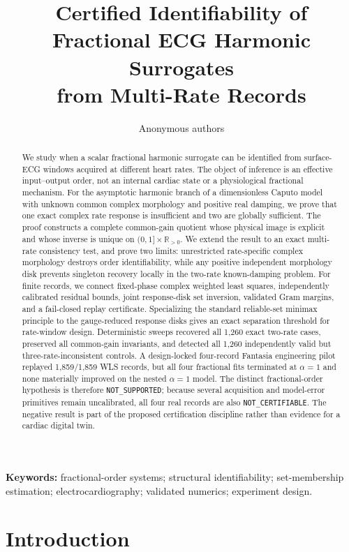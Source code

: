 \documentclass[11pt]{article}
\title{Certified Identifiability of Fractional ECG Harmonic Surrogates\\
from Multi-Rate Records}
\author{Anonymous authors}
\date{}
\theoremstyle{definition}
\theoremstyle{remark}
\newcommand{\R}{\mathbb R}
\newcommand{\status}[1]{\texttt{#1}}
\begin{document}
\maketitle

\begin{abstract}
We study when a scalar fractional harmonic surrogate can be identified from
surface-ECG windows acquired at different heart rates.  The object of
inference is an effective input--output order, not an internal cardiac state
or a physiological fractional mechanism.  For the asymptotic harmonic branch
of a dimensionless Caputo model with unknown common complex morphology and
positive real damping, we prove
that one exact complex rate response is insufficient and two are globally
sufficient.  The proof constructs a complete common-gain quotient whose
physical image is explicit and whose inverse is unique on
$(0,1]\times\R_{>0}$.  We extend the result to an exact multi-rate consistency
test, and prove two limits: unrestricted rate-specific complex morphology
destroys order identifiability, while any positive independent morphology
disk prevents singleton recovery locally in the two-rate known-damping
problem.  For finite records, we connect fixed-phase complex weighted least
squares, independently calibrated residual bounds, joint response-disk set
inversion, validated Gram margins, and a fail-closed replay certificate.
Specializing the standard reliable-set minimax principle to the gauge-reduced
response disks gives an exact separation threshold for rate-window design.
Deterministic sweeps recovered all 1,260 exact two-rate cases, preserved all
common-gain invariants, and detected all 1,260 independently valid but
three-rate-inconsistent controls.  A
design-locked four-record Fantasia engineering pilot replayed 1,859/1,859 WLS
records, but all four fractional fits terminated at $\alpha=1$ and none
materially improved on the nested $\alpha=1$ model.  The distinct
fractional-order hypothesis is therefore \status{NOT\_SUPPORTED}; because
several acquisition and model-error primitives remain uncalibrated, all four
real records are also \status{NOT\_CERTIFIABLE}.  The negative result is part
of the proposed certification discipline rather than evidence for a cardiac
digital twin.
\end{abstract}

\noindent\textbf{Keywords:} fractional-order systems; structural
identifiability; set-membership estimation; electrocardiography; validated
numerics; experiment design.

\section{Introduction}
\end{document}

